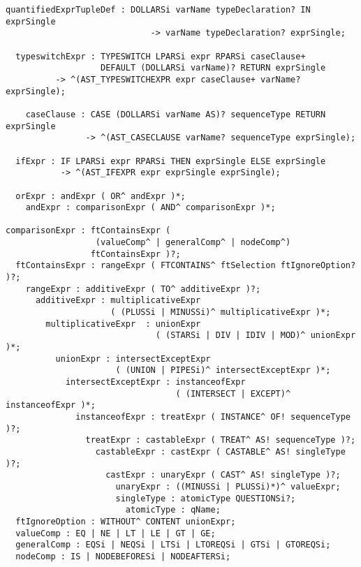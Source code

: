 \begin{Verbatim}[frame=none, fontsize=\footnotesize]
    quantifiedExprTupleDef : DOLLARSi varName typeDeclaration? IN exprSingle
                             -> varName typeDeclaration? exprSingle;

  typeswitchExpr : TYPESWITCH LPARSi expr RPARSi caseClause+ 
                   DEFAULT (DOLLARSi varName)? RETURN exprSingle
          -> ^(AST_TYPESWITCHEXPR expr caseClause+ varName? exprSingle);

    caseClause : CASE (DOLLARSi varName AS)? sequenceType RETURN exprSingle
                -> ^(AST_CASECLAUSE varName? sequenceType exprSingle);

  ifExpr : IF LPARSi expr RPARSi THEN exprSingle ELSE exprSingle
           -> ^(AST_IFEXPR expr exprSingle exprSingle);

  orExpr : andExpr ( OR^ andExpr )*;
    andExpr : comparisonExpr ( AND^ comparisonExpr )*;

comparisonExpr : ftContainsExpr ( 
                  (valueComp^ | generalComp^ | nodeComp^) 
                 ftContainsExpr )?;
  ftContainsExpr : rangeExpr ( FTCONTAINS^ ftSelection ftIgnoreOption? )?;
    rangeExpr : additiveExpr ( TO^ additiveExpr )?;
      additiveExpr : multiplicativeExpr 
                     ( (PLUSSi | MINUSSi)^ multiplicativeExpr )*;
        multiplicativeExpr  : unionExpr 
                              ( (STARSi | DIV | IDIV | MOD)^ unionExpr )*;
          unionExpr : intersectExceptExpr 
                      ( (UNION | PIPESi)^ intersectExceptExpr )*;
            intersectExceptExpr : instanceofExpr 
                                  ( (INTERSECT | EXCEPT)^ instanceofExpr )*;
              instanceofExpr : treatExpr ( INSTANCE^ OF! sequenceType )?;
                treatExpr : castableExpr ( TREAT^ AS! sequenceType )?;
                  castableExpr : castExpr ( CASTABLE^ AS! singleType )?;
                    castExpr : unaryExpr ( CAST^ AS! singleType )?;
                      unaryExpr : ((MINUSSi | PLUSSi)*)^ valueExpr;
                      singleType : atomicType QUESTIONSi?;
                        atomicType : qName;
  ftIgnoreOption : WITHOUT^ CONTENT unionExpr;
  valueComp : EQ | NE | LT | LE | GT | GE;
  generalComp : EQSi | NEQSi | LTSi | LTOREQSi | GTSi | GTOREQSi;
  nodeComp : IS | NODEBEFORESi | NODEAFTERSi;


\end{Verbatim}
